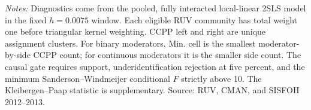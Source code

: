\begin{table}[!htbp]
\centering
\caption{Local support and fuzzy-heterogeneity identification diagnostics}
\label{tab:hte-2013_individual-diagnostics}
\small
{}
\parbox{0.97\linewidth}{\footnotesize \textit{Notes:} Diagnostics come from the pooled, fully interacted local-linear 2SLS model in the fixed \(h=0.0075\) window. Each eligible RUV community has total weight one before triangular kernel weighting. CCPP left and right are unique assignment clusters. For binary moderators, Min. cell is the smallest moderator-by-side CCPP count; for continuous moderators it is the smaller side count. The causal gate requires support, underidentification rejection at five percent, and the minimum Sanderson--Windmeijer conditional \(F\) strictly above 10. The Kleibergen--Paap statistic is supplementary. Source: RUV, CMAN, and SISFOH 2012--2013.}
\end{table}
